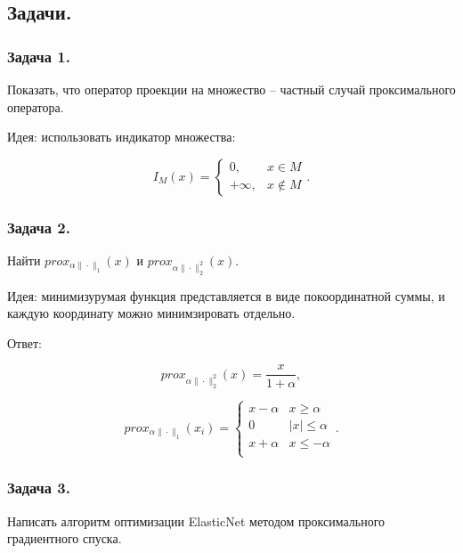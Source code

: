 \subsection*{Задачи.}

\subsubsection*{Задача 1.}

Показать, что оператор проекции на множество -- частный случай проксимального оператора.

Идея: использовать индикатор множества:

\begin{equation}
    I_M(x)=\begin{cases}
        0,       & x\in M     \\
        +\infty, & x\not\in M
    \end{cases}.
\end{equation}

\subsubsection*{Задача 2.}

Найти $prox_{\alpha\|\cdot\|_1}(x)$ и $prox_{\alpha\|\cdot\|_2^2}(x)$.

Идея: минимизурумая функция представляется в виде покоординатной суммы, и каждую координату можно минимзировать отдельно.

Ответ:

\begin{equation}
    prox_{\alpha\|\cdot\|_2^2}(x)=\frac{x}{1+\alpha},
\end{equation}

\begin{equation}
    prox_{\alpha\|\cdot\|_1}(x_i)=\begin{cases}
        x-\alpha & x\geq\alpha   \\
        0        & |x|\leq\alpha \\
        x+\alpha & x\leq-\alpha  \\
    \end{cases}.
\end{equation}

\subsubsection*{Задача 3.}

Написать алгоритм оптимизации ElasticNet методом проксимального градиентного спуска.

